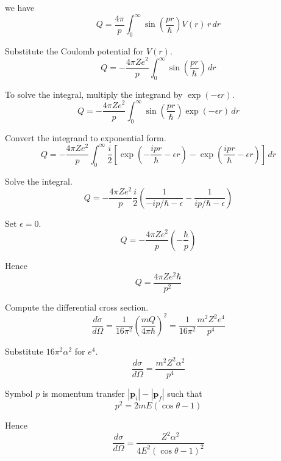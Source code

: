 we have
\begin{equation*}
Q=\frac{4\pi}{p}
\int_0^\infty\sin\left(\frac{pr}{\hbar}\right)V(r)\,r\,dr
\end{equation*}

Substitute the Coulomb potential for $V(r)$.
\begin{equation*}
Q=-\frac{4\pi Ze^2}{p}
\int_0^\infty\sin\left(\frac{pr}{\hbar}\right)\,dr
\end{equation*}

To solve the integral, multiply the integrand by $\exp(-\epsilon r)$.
\begin{equation*}
Q=-\frac{4\pi Ze^2}{p}
\int_0^\infty\sin\left(\frac{pr}{\hbar}\right)\exp(-\epsilon r)\,dr
\end{equation*}

Convert the integrand to exponential form.
\begin{equation*}
Q=-\frac{4\pi Ze^2}{p}
\int_0^\infty\frac{i}{2}\left[
\exp\left(-\frac{ipr}{\hbar}-\epsilon r\right)
-\exp\left(\frac{ipr}{\hbar}-\epsilon r\right)
\right]\,dr
\end{equation*}

Solve the integral.
\begin{equation*}
Q=-\frac{4\pi Ze^2}{p}\frac{i}{2}
\left(\frac{1}{-ip/\hbar-\epsilon}-\frac{1}{ip/\hbar-\epsilon}\right)
\tag{1}
\end{equation*}

Set $\epsilon=0$.
\begin{equation*}
Q=-\frac{4\pi Ze^2}{p}\left(-\frac{\hbar}{p}\right)
\end{equation*}

Hence
\begin{equation*}
Q=\frac{4\pi Ze^2\hbar}{p^2}
\end{equation*}

Compute the differential cross section.
\begin{equation*}
\frac{d\sigma}{d\Omega}=\frac{1}{16\pi^2}\left(\frac{mQ}{4\pi\hbar}\right)^2
=\frac{1}{16\pi^2}\frac{m^2Z^2e^4}{p^4}
\tag{2}
\end{equation*}

Substitute $16\pi^2\alpha^2$ for $e^4$.
\begin{equation*}
\frac{d\sigma}{d\Omega}=\frac{m^2Z^2\alpha^2}{p^4}
\end{equation*}

Symbol $p$ is momentum transfer $|\mathbf p_i|-|\mathbf p_f|$ such that
\begin{equation*}
p^2=2mE(\cos\theta-1)
\end{equation*}

Hence
\begin{equation*}
\frac{d\sigma}{d\Omega}=\frac{Z^2\alpha^2}{4E^2(\cos\theta-1)^2}
\tag{3}
\end{equation*}


